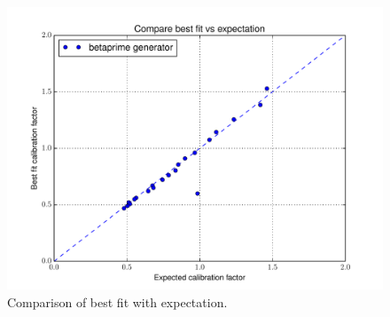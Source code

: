  \begin{figure}[htbp] \begin{center} 
\includegraphics[width=1.00\textwidth]{../FIGURES/171/FIG_Compare_best_fit_vs_expectation.pdf} 
\caption{Comparison of best fit with expectation.} 
\label{tab:extra_171} 
\end{center} \end{figure} 
\clearpage
 